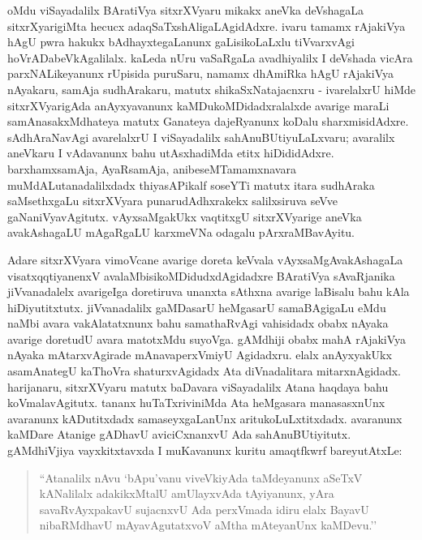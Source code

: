 oMdu viSayadalilx BAratiVya sitxrXVyaru mikakx aneVka deVshagaLa sitxrXyarigiMta hecucx adaqSaTxshAligaLAgidAdxre. ivaru tamamx rAjakiVya hAgU pwra hakukx bAdhayxtegaLanunx gaLisikoLaLxlu tiVvarxvAgi hoVrADabeVkAgalilalx. kaLeda nUru vaSaRgaLa avadhiyalilx I deVshada vicAra parxNALikeyanunx rUpisida puruSaru, namamx dhAmiRka hAgU rAjakiVya nAyakaru, samAja sudhArakaru, matutx shikaSxNatajacnxru - ivarelalxrU hiMde sitxrXVyarigAda anAyxyavanunx kaMDukoMDidadxralalxde avarige maraLi samAnasakxMdhateya matutx Ganateya dajeRyanunx koDalu sharxmisidAdxre. sAdhAraNavAgi avarelalxrU I viSayadalilx sahAnuBUtiyuLaLxvaru; avaralilx aneVkaru I vAdavanunx bahu utAsxhadiMda etitx hiDididAdxre. barxhamxsamAja, AyaRsamAja, anibeseMTamamxnavara muMdALutanadalilxdadx thiyasAPikalf soseYTi matutx itara sudhAraka saMsethxgaLu sitxrXVyara punarudAdhxrakekx salilxsiruva seVve gaNaniVyavAgitutx. vAyxsaMgakUkx vaqtitxgU sitxrXVyarige aneVka avakAshagaLU mAgaRgaLU karxmeVNa odagalu pArxraMBavAyitu.

Adare sitxrXVyara vimoVcane avarige doreta keVvala vAyxsaMgAvakAshagaLa visatxqqti\-yanenxV avalaMbisikoMDidudxdAgidadxre BAratiVya sAvaRjanika jiVvanadalelx avarige\break Iga doretiruva unanxta sAthxna avarige laBisalu bahu kAla hiDiyutitxtutx. jiVvana\-dalilx gaMDasarU heMgasarU samaBAgigaLu eMdu naMbi avara vakAlatatxnunx bahu samathaR\-vAgi vahisidadx obabx nAyaka avarige doretudU avara matotxMdu \hbox{suyoVga}. gAMdhiji obabx mahA rAjakiVya nAyaka mAtarxvAgirade mAnavaperxVmiyU Agidadxru. elalx anAyxyakUkx asamAnategU kaThoVra shaturxvAgidadx Ata diVnadalitara mitarxnAgidadx. harijanaru, sitxrXVyaru matutx baDavara viSayadalilx Atana haqdaya bahu koVmalavAgitutx. tananx huTaTxriviniMda Ata heMgasara manasasxnUnx avaranunx kADutitxdadx samaseyxgaLanUnx aritukoLuLxtitxdadx. avaranunx kaMDare Atanige gADhavU aviciCxnanxvU Ada sahAnuBUtiyitutx. gAMdhiVjiya vayxkitxtavxda I muKavanunx kuritu amaqtfkwrf bareyutAtxLe:

\begin{quote}
``Atanalilx nAvu `bApu'vanu viveVkiyAda taMdeyanunx aSeTxV kANalilalx adakikxMtalU amUlayxvAda tAyiyanunx, yAra savaR\-vAyxpakavU sujacnxvU Ada perxVmada idiru elalx BayavU nibaRMdhavU mAyavAgutatxvoV aMtha mAteyanUnx kaMDevu.''
\end{quote}

